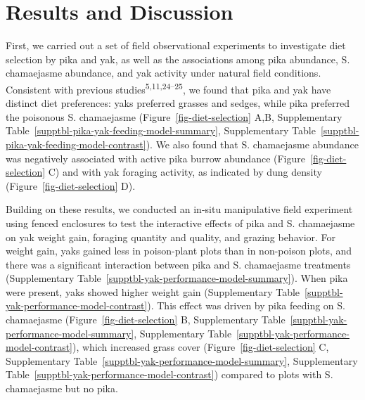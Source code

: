 \documentclass[
  letterpaper,
  DIV=11,
  numbers=noendperiod]{scrartcl}
\begin{document}
\section{Results and Discussion}\label{results-and-discussion}

First, we carried out a set of field observational experiments to
investigate diet selection by pika and yak, as well as the associations
among pika abundance, S. chamaejasme abundance, and yak activity under
natural field conditions. Consistent with previous
studies\textsuperscript{5,11,24--25}, we found that pika and yak have
distinct diet preferences: yaks preferred grasses and sedges, while pika
preferred the poisonous S. chamaejasme (Figure~\ref{fig-diet-selection}
A,B, Supplementary Table~\ref{supptbl-pika-yak-feeding-model-summary},
Supplementary Table~\ref{supptbl-pika-yak-feeding-model-contrast}). We
also found that S. chamaejasme abundance was negatively associated with
active pika burrow abundance (Figure~\ref{fig-diet-selection} C) and
with yak foraging activity, as indicated by dung density
(Figure~\ref{fig-diet-selection} D).

Building on these results, we conducted an in-situ manipulative field
experiment using fenced enclosures to test the interactive effects of
pika and S. chamaejasme on yak weight gain, foraging quantity and
quality, and grazing behavior. For weight gain, yaks gained less in
poison-plant plots than in non-poison plots, and there was a significant
interaction between pika and S. chamaejasme treatments
(Supplementary Table~\ref{supptbl-yak-performance-model-summary}). When
pika were present, yaks showed higher weight gain
(Supplementary Table~\ref{supptbl-yak-performance-model-contrast}). This
effect was driven by pika feeding on S. chamaejasme
(Figure~\ref{fig-diet-selection} B,
Supplementary Table~\ref{supptbl-yak-performance-model-summary},
Supplementary Table~\ref{supptbl-yak-performance-model-contrast}), which
increased grass cover (Figure~\ref{fig-diet-selection} C,
Supplementary Table~\ref{supptbl-yak-performance-model-summary},
Supplementary Table~\ref{supptbl-yak-performance-model-contrast})
compared to plots with S. chamaejasme but no pika.
\end{document}
